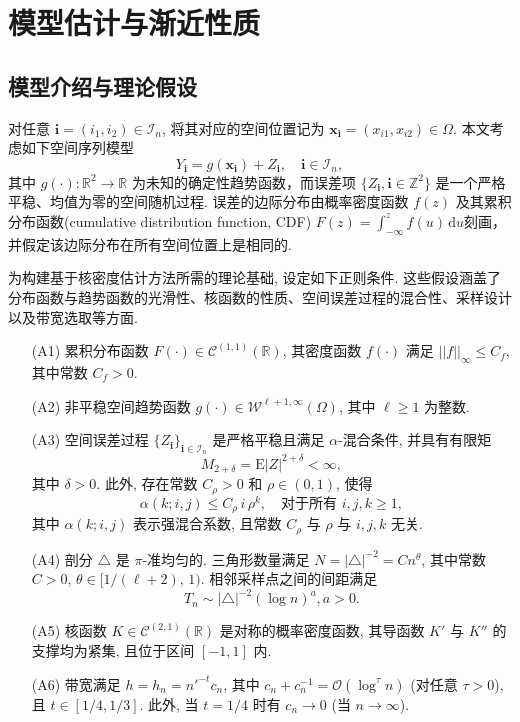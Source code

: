 \documentclass[a4paper,openay,14pt]{ctexbook}
\numberwithin{equation}{section}
\numberwithin{lem}{section}
\newcommand{\chapterwithfancyheader}[1]{  
    \chapter{#1} %
    \thispagestyle{fancy} %
}
\begin{document}
\chapterwithfancyheader{模型估计与渐近性质}\label{SEC: result}
\section{模型介绍与理论假设}
对任意 \(\mathbf{i} = (i_1, i_2) \in \mathcal{I}_n\), 将其对应的空间位置记为 \(\boldsymbol{x}_{\mathbf{i}} = (x_{i1}, x_{i2}) \in \Omega\). 本文考虑如下空间序列模型
\begin{equation}\label{model:nonparbiregression}
   Y_{\mathbf{i}} = g(\boldsymbol{x}_{\mathbf{i}}) + Z_{\mathbf{i}}, 
   \quad \mathbf{i} \in \mathcal{I}_n,
\end{equation}
其中 \( g(\cdot): \mathbb{R}^2 \to \mathbb{R} \) 为未知的确定性趋势函数，而误差项
\(\{Z_{\mathbf{i}}, \mathbf{i} \in \mathbb{Z}^2\}\) 是一个严格平稳、均值为零的空间随机过程. 误差的边际分布由概率密度函数 \( f(z) \) 及其累积分布函数(cumulative distribution function, CDF)
\(F(z) = \int_{-\infty}^{z} f(u)\,\mathrm{d}u\)刻画，并假定该边际分布在所有空间位置上是相同的.

为构建基于核密度估计方法所需的理论基础, 设定如下正则条件. 这些假设涵盖了分布函数与趋势函数的光滑性、核函数的性质、空间误差过程的混合性、采样设计以及带宽选取等方面.

\begin{itemize}
\item[(A1)] 累积分布函数 $F(\cdot) \in \mathcal{C}^{(1,1)}(\mathbb{R})$, 其密度函数 $f(\cdot)$ 满足 \( || f ||_{\infty} \leq C_f \), 其中常数 \( C_f > 0 \).

\item[(A2)] 非平稳空间趋势函数 $g(\cdot) \in \mathcal{W}^{\ell+1, \infty}(\Omega)$, 其中 $\ell \geq 1$ 为整数.

\item[(A3)] 空间误差过程 $\{ Z_{\mathbf{i}} \}_{\mathbf{i} \in \mathcal{I}_n}$ 是严格平稳且满足 $\alpha$-混合条件, 并具有有限矩
\[
M_{2+\delta} = \mathrm{E}|Z|^{2+\delta} < \infty,
\]
其中 $\delta > 0$. 此外, 存在常数 $C_\rho > 0$ 和 $\rho \in (0,1)$, 使得
\[
\alpha(k; i, j) \leq C_\rho\, i\, \rho^k, \quad \text{对于所有 } i, j, k \geq 1,
\]
其中 $\alpha(k; i, j)$ 表示强混合系数, 且常数 $C_\rho$ 与 $\rho$ 与 $i, j, k$ 无关.

\item[(A4)] 剖分 $\triangle$ 是 $\pi$-准均匀的. 三角形数量满足 $N = |\triangle|^{-2} = C n^\theta$, 其中常数 $C > 0$, $\theta \in [1/(\ell+2),\,1)$. 相邻采样点之间的间距满足
\[
T_n \sim |\triangle|^{-2} (\log n)^a, a > 0.\]

\item[(A5)] 核函数 $K \in \mathcal{C}^{(2,1)}(\mathbb{R})$ 是对称的概率密度函数, 其导函数 $K'$ 与 $K''$ 的支撑均为紧集, 且位于区间 $[-1,1]$ 内.

\item[(A6)] 带宽满足 $h = h_n = n'^{-t} c_n$, 其中 $c_n + c_n^{-1} = {\scriptstyle{\mathcal{O}}}(\log^\tau n)$ (对任意 $\tau > 0$), 且 $t \in [1/4, 1/3]$. 此外, 当 $t = 1/4$ 时有 $c_n \to 0$ (当 $n \to \infty$).
\end{itemize}
\end{document}
